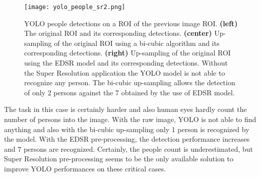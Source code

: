 \documentclass{standalone}
\begin{document}
\begin{figure}[htbp]
\centering
\texttt{[image: yolo\_people\_sr2.png]}
\caption{YOLO people detections on a ROI of the previous image ROI.
\textbf{(left)} The original ROI and its corresponding detections.
\textbf{(center)} Up-sampling of the original ROI using a bi-cubic algorithm and its corresponding detections.
\textbf{(right)} Up-sampling of the original ROI using the EDSR model and its corresponding detections.
Without the Super Resolution application the YOLO model is not able to recognize any person.
The bi-cubic up-sampling allows the detection of only 2 persons against the 7 obtained by the use of EDSR model.
}
\label{fig:yolo_sr2}
\end{figure}

The task in this case is certainly harder and also human eyes hardly count the number of persons into the image.
With the raw image, YOLO is not able to find anything and also with the bi-cubic up-sampling only 1 person is recognized by the model.
With the EDSR pre-processing, the detection performance increases and $7$ persons are recognized.
Certainly, the people count is underestimated, but Super Resolution pre-processing seems to be the only available solution to improve YOLO performances on these critical cases.
\end{document}
